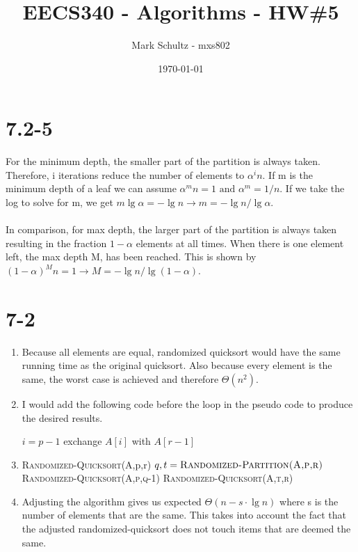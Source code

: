\documentclass[11pt]{article}
\begin{document}
\title{EECS340 - Algorithms - HW\#5}
\date{\today}
\author{Mark Schultz - mxs802}
\maketitle
\vspace{2in}

\section*{7.2-5}
For the minimum depth, the smaller part of the partition is always taken. Therefore, i iterations reduce the number of elements to $\alpha^in$. If m is the minimum depth of a leaf we can assume $\alpha^mn=1 \text{ and }\alpha^m=1/n$. If we take the log to solve for m, we get $m\lg\alpha=-\lg n \rightarrow m=-\lg n/\lg\alpha$.
\\
\\
In comparison, for max depth, the larger part of the partition is always taken resulting in the fraction $1-\alpha$ elements at all times. When there is one element left, the max depth M, has been reached. This is shown by $(1-\alpha)^Mn=1 \rightarrow M=-\lg n/\lg(1-\alpha)$.

\section*{7-2}
\begin{enumerate}
\item Because all elements are equal, randomized quicksort would have the same running time as the original quicksort. Also because every element is the same, the worst case is achieved and therefore $\Theta (n^2)$. 
\item I would add the following code before the loop in the pseudo code to produce the desired results.

\begin{algorithmic}[1]
\STATE $i=p-1$
\STATE exchange $A[i]$ with $A[r-1]$
\ENDIF
\ENDFOR
\end{algorithmic}
 
\item 

\begin{samepage}
\begin{algorithmic}[1]
\STATE \textsc{Randomized-Quicksort}(A,p,r)
\STATE $q,t=\textsc{Randomized-Partition(A,p,r)}$
\STATE \textsc{Randomized-Quicksort(A,p,q-1)}
\STATE \textsc{Randomized-Quicksort(A,t,r)}
\ENDIF
\end{algorithmic}
\end{samepage}

\item Adjusting the algorithm gives us expected $\Theta(n-s\cdot\lg n)$ where s is the number of elements that are the same. This takes into account the fact that the adjusted randomized-quicksort does not touch items that are deemed the same.
\end{enumerate}
\end{document}
